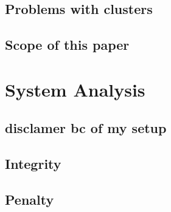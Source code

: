 \documentclass[titlepage, a4paper, 11pt]{scrartcl}
\begin{document}


        \subsection{Problems with clusters}


        \subsection{Scope of this paper}

    \section{System Analysis}


        \subsection{disclamer bc of my setup}



        \subsection{Integrity}



        \subsection{Penalty}

\end{document}

